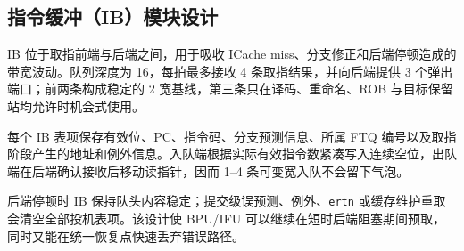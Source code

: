 \subsection{指令缓冲（IB）模块设计}

IB 位于取指前端与后端之间，用于吸收 ICache miss、分支修正和后端停顿造成的带宽波动。队列深度为 16，每拍最多接收 4 条取指结果，并向后端提供 3 个弹出端口；前两条构成稳定的 2 宽基线，第三条只在译码、重命名、ROB 与目标保留站均允许时机会式使用。

每个 IB 表项保存有效位、PC、指令码、分支预测信息、所属 FTQ 编号以及取指阶段产生的地址和例外信息。入队端根据实际有效指令数紧凑写入连续空位，出队端在后端确认接收后移动读指针，因而 1--4 条可变宽入队不会留下气泡。

后端停顿时 IB 保持队头内容稳定；提交级误预测、例外、\texttt{ertn} 或缓存维护重取会清空全部投机表项。该设计使 BPU/IFU 可以继续在短时后端阻塞期间预取，同时又能在统一恢复点快速丢弃错误路径。
